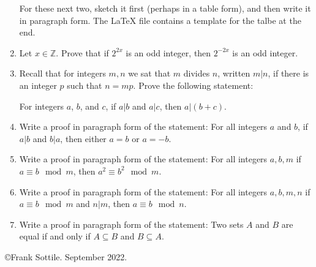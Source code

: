 \documentclass[12pt]{article}
\newcommand{\ZZ}{{\mathbb Z}}  %
\begin{document}
\begin{enumerate}
 \newpage

 For these next two,  sketch it first (perhaps in a table form), and then write it in paragraph form.
 The LaTeX file contains a template for the talbe at the end.
  
\item Let $x\in \ZZ$.  Prove that if $2^{2x}$ is an odd integer, then $2^{-2x}$ is an odd integer.

\item Recall that for integers $m,n$ we sat that $m$ divides $n$, written $m|n$, if there is an integer $p$ such that $n=mp$.
   Prove the following statement:

     For integers $a$, $b$, and $c$, if $a|b$ and $a|c$, then $a|(b+c)$.


 \item Write a proof in paragraph form of the statement: For all integers $a$ and $b$, if $a|b$ and $b|a$, then either
   $a=b$ or $a=-b$.


 \item Write a proof in paragraph form of the statement: For all integers $a,b,m$ if $a\equiv b\mod m$, then
   $a^2\equiv b^2\mod m$.

 \item Write a proof in paragraph form of the statement: For all integers $a,b,m,n$ if $a\equiv b\mod m$ and $n|m$, then
   $a\equiv b\mod n$.


 \item Write a proof in paragraph form of the statement: Two sets $A$ and $B$ are equal if and only if $A\subseteq B$ and
     $B\subseteq A$.


\end{enumerate}


\noindent\copyright Frank Sottile.  September 2022.
\end{document}
